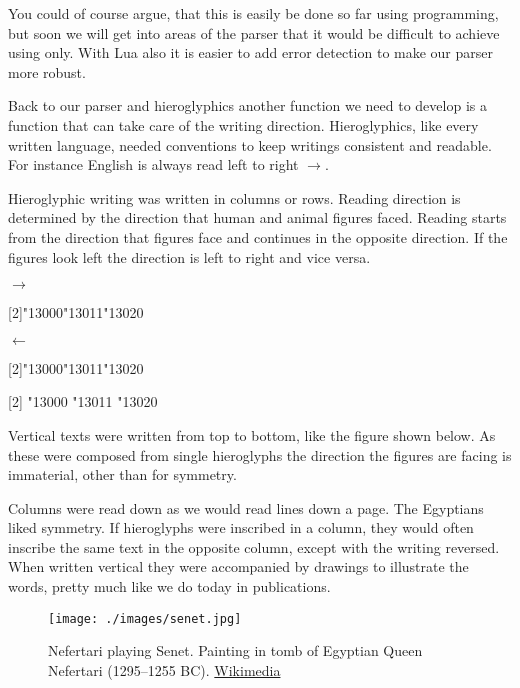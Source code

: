You could of course argue, that this is easily be done so far using \tex programming, but soon we will get into areas of the parser that it would be difficult to achieve using \tex only. With Lua also it is easier to add error detection to make our parser more robust.

Back to our parser and hieroglyphics another function we need to develop is a function that can take care of the writing direction. Hieroglyphics, like every written language,  needed conventions to keep writings consistent and readable. For instance English is always read left to right $\rightarrow$. 

Hieroglyphic writing was written in columns or rows. Reading direction is determined by the direction that human and animal figures faced. Reading starts from the direction that figures face and continues in the opposite direction. If the figures look left the direction is left to right and vice versa.

\begin{center}
\bgroup
$\rightarrow$

\scalebox{2}[2]{\hiero\char"13000\char"13011\char"13020}

$\leftarrow$

\scalebox{-2}[2]{\hiero\char"13000\char"13011\char"13020}

\scalebox{2}[2]{\hiero
\char"13000
\char"13011
\char"13020}
\egroup
\end{center}

Vertical texts were written from top to bottom, like the figure shown below. As these were composed from single hieroglyphs the direction the figures are facing is immaterial, other than for symmetry.

\begin{center}
{\hiero
\makebox[3em]{\scalebox{-2}[2]{\hiero
\char"13001}\hss}
\vskip3pt
\makebox[3em]{\scalebox{-2}[2]{\hiero
\char"13006}\hss}
\vskip3pt
\makebox[3em]{\scalebox{-2}[2]{\hiero
\char"13007}\hss}
}
\end{center}

Columns were read down as we would read lines down a page. The Egyptians liked symmetry. If hieroglyphs were inscribed in a column, they would often inscribe the same text in the opposite column, except with the writing reversed. When written vertical they were accompanied by drawings to illustrate the words, pretty much like we do today in publications.

\begin{figure}[hb]
\centering
\texttt{[image: ./images/senet.jpg]}
\caption{Nefertari playing Senet. Painting in tomb of Egyptian Queen Nefertari (1295–1255 BC). \href{http://en.wikipedia.org/wiki/Senet}{Wikimedia}}
\end{figure}



